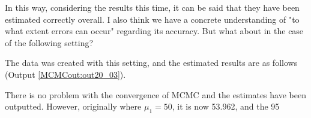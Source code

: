\documentclass{ltjsbook}
\begin{document}
In this way, considering the results this time, it can be said that they have been estimated correctly overall. I also think we have a concrete understanding of "to what extent errors can occur" regarding its accuracy.
But what about in the case of the following setting?

The data was created with this setting, and the estimated results are as follows (Output \ref{MCMCout:out20_03}).

There is no problem with the convergence of MCMC and the estimates have been outputted. However, originally where $\mu_1=50$, it is now 53.962, and the 95%
\end{document}
